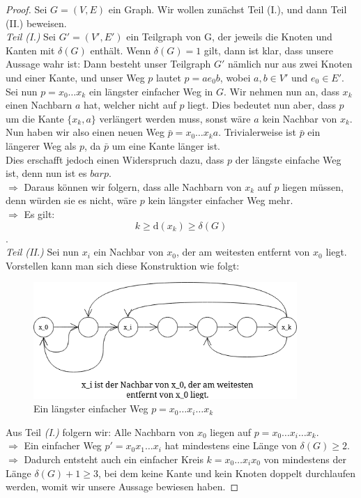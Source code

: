\documentclass{article}
\theoremstyle{plain}
\begin{document}
\begin{proof}
	Sei $G = (V, E)$ ein Graph. Wir wollen zunächst Teil (I.), und dann Teil (II.) beweisen.\\
	\emph{Teil (I.)} Sei $G' = (V', E')$ ein Teilgraph von G, der jeweils die Knoten und Kanten mit $\delta(G)$ enthält. Wenn $\delta(G) = 1$ gilt, dann ist klar, dass unsere Aussage wahr ist: Dann besteht unser Teilgraph $G'$ nämlich nur aus zwei Knoten und einer Kante, und unser Weg $p$ lautet $p = ae_0b$, wobei $a, b \in V'$ und $e_0 \in E'$.\\
	Sei nun $p = x_0 \ldots x_k$ ein längster einfacher Weg in $G$. Wir nehmen nun an, dass $x_k$ einen Nachbarn $a$ hat, welcher nicht auf $p$ liegt. Dies bedeutet nun aber, dass $p$ um die Kante $\{x_k, a\}$ verlängert werden muss, sonst wäre $a$ kein Nachbar von $x_k$.\\
	Nun haben wir also einen neuen Weg $\bar{p} = x_0 \ldots x_k a$. Trivialerweise ist $\bar{p}$ ein längerer Weg als $p$, da $\bar{p}$ um eine Kante länger ist.\\
	Dies erschafft jedoch einen Widerspruch dazu, dass $p$ der längste einfache Weg ist, denn nun ist es $bar{p}$.\\
	$\Rightarrow$ Daraus können wir folgern, dass alle Nachbarn von $x_k$ auf $p$ liegen müssen, denn würden sie es nicht, wäre $p$ kein längster einfacher Weg mehr.\\
	$\Rightarrow$ Es gilt: $$k \ge \text{d}(x_k) \geq \delta(G)$$.\\
	\emph{Teil (II.)} Sei nun $x_i$ ein Nachbar von $x_0$, der am weitesten entfernt von $x_0$ liegt. Vorstellen kann man sich diese Konstruktion wie folgt:\\
    \vfill
	\begin{figure}[htp]
	    \centering
	    \includegraphics[width=10cm]{vortrag_schriftlich/images/proof_thm.drawio.png}
	    \caption{Ein längster einfacher Weg $p = x_0 \ldots x_i \ldots x_k$}
	    \label{fig:fig8}
	\end{figure}
    \vfill
	Aus Teil \emph{(I.)} folgern wir: Alle Nachbarn von $x_0$ liegen auf $p = x_0 \ldots x_i \ldots x_k$.\\
	$\Rightarrow$ Ein einfacher Weg $p' = x_0 x_1 \ldots x_i$ hat mindestens eine Länge von $\delta(G) \geq 2$.\\
	$\Rightarrow$ Dadurch entsteht auch ein einfacher Kreis $k = x_0 \ldots x_i x_0$ von mindestens der Länge $\delta(G) + 1 \geq 3$, bei dem keine Kante und kein Knoten doppelt durchlaufen werden, womit wir unsere Aussage bewiesen haben.\cite[S.~10]{bue_1}
\end{proof}
\end{document}
